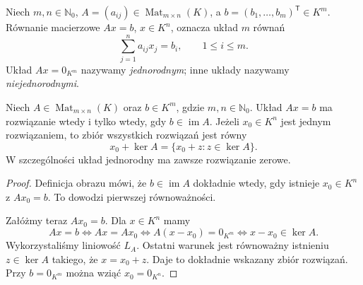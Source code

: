 \begin{definicja}
\label{def:lin4-uklad}
Niech \(m,n\in\mathbb N_0\),
\(A=(a_{ij})\in\operatorname{Mat}_{m\times n}(K)\),
a \(b=(b_1,\ldots,b_m)^{\mathsf T}\in K^m\).
Równanie macierzowe \(Ax=b\), \(x\in K^n\),
oznacza układ \(m\) równań
\[
 \sum_{j=1}^{n}a_{ij}x_j=b_i,
 \qquad 1\leq i\leq m.
\]
Układ \(Ax=0_{K^m}\) nazywamy
\emph{jednorodnym}; inne układy nazywamy
\emph{niejednorodnymi}.
\end{definicja}

\begin{twierdzenie}
\label{thm:lin4-zbior-rozwiazan}
Niech \(A\in\operatorname{Mat}_{m\times n}(K)\)
oraz \(b\in K^m\), gdzie \(m,n\in\mathbb N_0\).
Układ \(Ax=b\) ma rozwiązanie
wtedy i tylko wtedy, gdy \(b\in\operatorname{im}A\).
Jeżeli \(x_0\in K^n\) jest jednym rozwiązaniem,
to zbiór wszystkich rozwiązań jest równy
\[
 x_0+\ker A=\{x_0+z:z\in\ker A\}.
\]
W szczególności układ jednorodny
ma zawsze rozwiązanie zerowe.
\end{twierdzenie}
\begin{proof}
Definicja obrazu mówi, że
\(b\in\operatorname{im}A\) dokładnie wtedy,
gdy istnieje \(x_0\in K^n\) z \(Ax_0=b\).
To dowodzi pierwszej równoważności.

Załóżmy teraz \(Ax_0=b\).
Dla \(x\in K^n\) mamy
\[
 Ax=b
 \iff Ax=Ax_0
 \iff A(x-x_0)=0_{K^m}
 \iff x-x_0\in\ker A.
\]
Wykorzystaliśmy liniowość \(L_A\).
Ostatni warunek jest równoważny
istnieniu \(z\in\ker A\)
takiego, że \(x=x_0+z\).
Daje to dokładnie wskazany zbiór rozwiązań.
Przy \(b=0_{K^m}\) można wziąć \(x_0=0_{K^n}\).
\end{proof}

